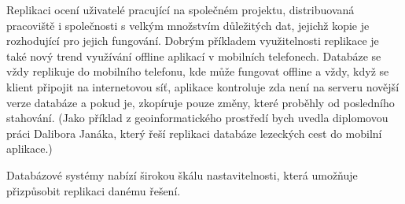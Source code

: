 Replikaci ocení uživatelé pracující na společném projektu, distribuovaná pracoviště i společnosti s velkým množstvím důležitých dat, jejichž kopie je rozhodující pro jejich fungování. Dobrým příkladem využitelnosti replikace je také nový trend využívání offline aplikací v mobilních telefonech. Databáze se vždy replikuje do mobilního telefonu, kde může fungovat offline a vždy, když se klient připojit na internetovou síť, aplikace kontroluje zda není na serveru novější verze databáze a pokud je, zkopíruje pouze změny, které proběhly od posledního stahování. (Jako příklad z geoinformatického prostředí bych uvedla diplomovou práci Dalibora Janáka, který řeší replikaci databáze lezeckých cest do mobilní aplikace.) 

Databázové systémy nabízí širokou škálu nastavitelnosti, která umožňuje přizpůsobit replikaci danému řešení.
